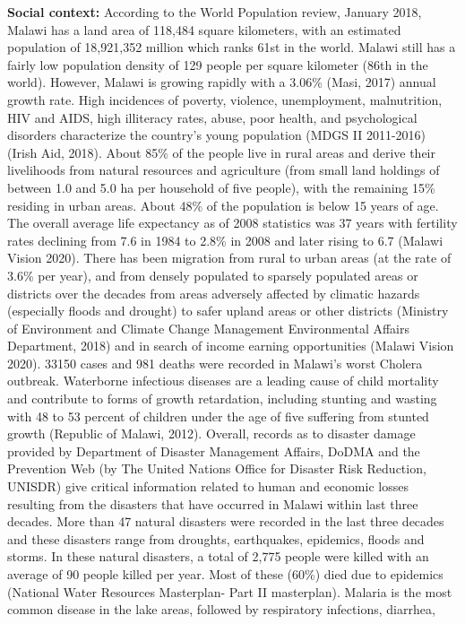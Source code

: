 \documentclass[
]{book}
\begin{document}
\textbf{Social context:} According to the World Population review, January 2018, Malawi has a land area of 118,484 square kilometers, with an estimated population of
18,921,352 million which ranks 61st in the world. Malawi still has a fairly low population density of 129 people per square kilometer (86th in the world).
However, Malawi is growing rapidly with a 3.06\% (Masi, 2017) annual growth rate. High incidences of poverty, violence, unemployment, malnutrition, HIV and AIDS,
high illiteracy rates, abuse, poor health, and psychological disorders characterize the country's young population (MDGS II 2011-2016) (Irish Aid, 2018). About
85\% of the people live in rural areas and derive their livelihoods from natural resources and agriculture (from small land holdings of between 1.0 and 5.0 ha per
household of five people), with the remaining 15\% residing in urban areas. About 48\% of the population is below 15 years of age. The overall average life
expectancy as of 2008 statistics was 37 years with fertility rates declining from 7.6 in 1984 to 2.8\% in 2008 and later rising to 6.7 (Malawi Vision 2020). There
has been migration from rural to urban areas (at the rate of 3.6\% per year), and from densely populated to sparsely populated areas or districts over the decades
from areas adversely affected by climatic hazards (especially floods and drought) to safer upland areas or other districts (Ministry of Environment and Climate
Change Management Environmental Affairs Department, 2018) and in search of income earning opportunities (Malawi Vision 2020). 33150 cases and 981 deaths were
recorded in Malawi's worst Cholera outbreak. Waterborne infectious diseases are a leading cause of child mortality and contribute to forms of growth retardation,
including stunting and wasting with 48 to 53 percent of children under the age of five suffering from stunted growth (Republic of Malawi, 2012). Overall, records
as to disaster damage provided by Department of Disaster Management Affairs, DoDMA and the Prevention Web (by The United Nations Office for Disaster Risk
Reduction, UNISDR) give critical information related to human and economic losses resulting from the disasters that have occurred in Malawi within last three
decades. More than 47 natural disasters were recorded in the last three decades and these disasters range from droughts, earthquakes, epidemics, floods and
storms. In these natural disasters, a total of 2,775 people were killed with an average of 90 people killed per year. Most of these (60\%) died due to epidemics
(National Water Resources Masterplan- Part II masterplan). Malaria is the most common disease in the lake areas, followed by respiratory infections, diarrhea,
\end{document}
